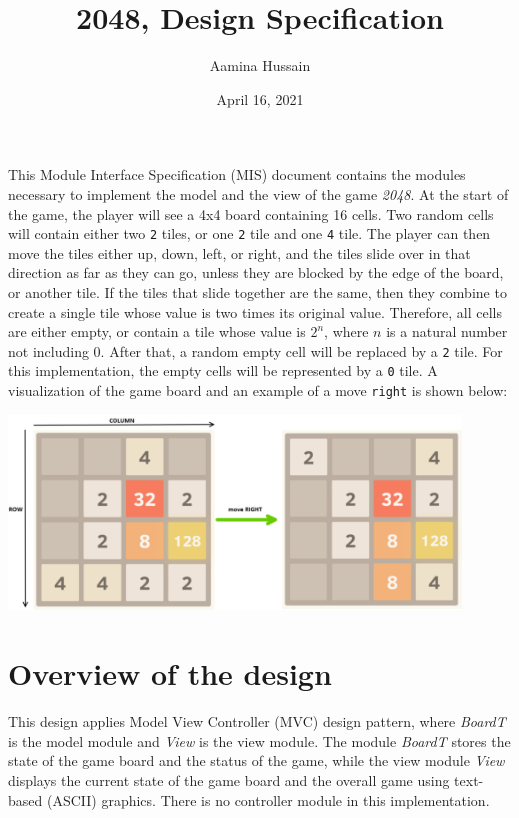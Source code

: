 \documentclass[12pt]{article}
\title{2048, Design Specification}
\author{Aamina Hussain}
\date{April 16, 2021}
\begin{document}
\maketitle
This Module Interface Specification (MIS) document contains the modules necessary to implement the model and the view of the game \textit{2048}. At the start of the game, the player will see a 4x4 board containing 16 cells. Two random cells will contain either two \texttt{2} tiles, or one \texttt{2} tile and one \texttt{4} tile. The player can then move the tiles either up, down, left, or right, and the tiles slide over in that direction as far as they can go, unless they are blocked by the edge of the board, or another tile. If the tiles that slide together are the same, then they combine to create a single tile whose value is two times its original value. Therefore, all cells are either empty, or contain a tile whose value is $2^n$, where $n$ is a natural number not including $0$. After that, a random empty cell will be replaced by a \texttt{2} tile. For this implementation, the empty cells will be represented by a \texttt{0} tile. A visualization of the game board and an example of a move \texttt{right} is shown below:

\begin{center}
  \includegraphics[width=0.9\textwidth]{moveright.PNG}
\end{center}

\newpage

\section{Overview of the design}

This design applies Model View Controller (MVC) design pattern, where \textit{BoardT} is the model module and \textit{View} is the view module. The module \textit{BoardT} stores the state of the game board and the status of the game, while the view module \textit{View} displays the current state of the game board and the overall game using text-based (ASCII) graphics. There is no controller module in this implementation.
\end{document}

